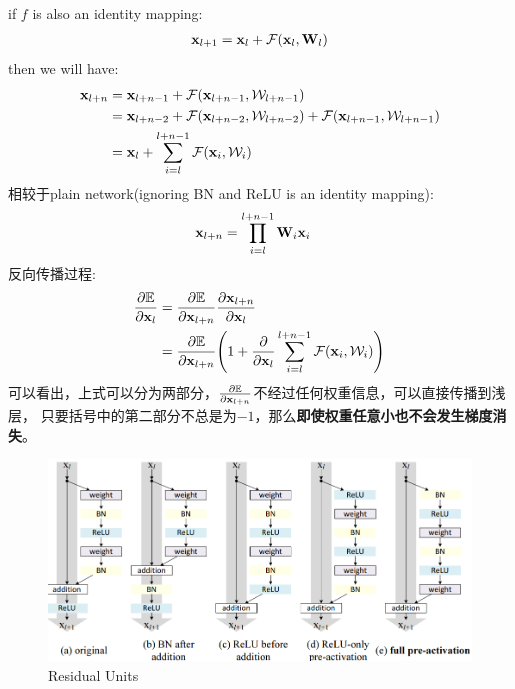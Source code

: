 if $f$ is also an identity mapping:
\begin{equation}
    \begin{split}
        \mathbf{x}_{l+1} = \mathbf{x}_l + \mathcal{F}(\mathbf{x}_l, \mathbf{W}_l)
    \end{split}
\end{equation}
then we will have:
\begin{equation}
    \begin{split}
        \mathbf{x}_{l+n} &= \mathbf{x}_{l + n - 1} + \mathcal{F}(\mathbf{x}_{l + n -1}, \mathcal{W}_{l + n -1}) \\
        &= \mathbf{x}_{l + n - 2} + \mathcal{F}(\mathbf{x}_{l + n - 2}, \mathcal{W}_{l + n - 2}) + \mathcal{F}(\mathbf{x}_{l + n -1}, \mathcal{W}_{l + n -1})\\
        &= \mathbf{x}_l + \sum_{i=l}^{l+n-1} \mathcal{F}(\mathbf{x}_i, \mathcal{W}_i)
    \end{split}
\end{equation}
相较于plain network(ignoring BN and ReLU is an identity mapping):
\begin{equation}
    \begin{split}
        \mathbf{x}_{l+n} &= \prod_{i=l}^{l+n-1} \mathbf{W}_i \mathbf{x}_i
    \end{split}
\end{equation}
反向传播过程:
\begin{equation}
    \begin{split}
        \frac{\partial \mathbb{E}}{\partial \mathbf{x}_l}
        &= \frac{\partial \mathbb{E}}{\partial \mathbf{x}_{l+n}} \frac{\partial \mathbf{x}_{l+n}}{\partial \mathbf{x}_l} \\
        &= \frac{\partial \mathbb{E}}{\partial \mathbf{x}_{l+n}} \Bigg (1 + \frac{\partial}{\partial \mathbf{x}_{l}}\sum_{i=l}^{l+n-1} \mathcal{F}(\mathbf{x}_i, \mathcal{W}_i)\Bigg)
    \end{split}
\end{equation}
可以看出，上式可以分为两部分，$\frac{\partial \mathbb{E}}{\partial \mathbf{x}_{l+n}}$不经过任何权重信息，可以直接传播到浅层，
只要括号中的第二部分不总是为$-1$，那么\textbf{即使权重任意小也不会发生梯度消失}。

\begin{figure}[H]
    \centering
    \includegraphics[width=14cm]{images/residual_units.png}
    \caption{Residual Units}
    \label{fig:residual_units}
\end{figure}


